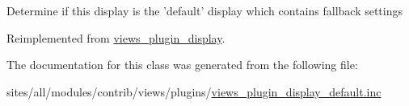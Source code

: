 Determine if this display is the 'default' display which contains fallback settings 

Reimplemented from \hyperlink{classviews__plugin__display_4f4562c1d689d8d3494b78d676249732}{views\_\-plugin\_\-display}.

The documentation for this class was generated from the following file:\begin{CompactItemize}
\item 
sites/all/modules/contrib/views/plugins/\hyperlink{views__plugin__display__default_8inc}{views\_\-plugin\_\-display\_\-default.inc}\end{CompactItemize}
